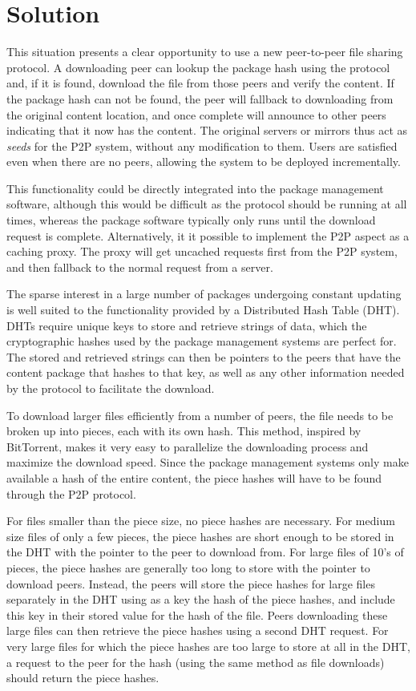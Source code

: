 \documentclass{sig-alt-release2}
\begin{document}
\section{Solution}

This situation presents a clear opportunity to use a new
peer-to-peer file sharing protocol.
A downloading peer can lookup the package hash using the protocol and, if it
is found, download the file from those peers and verify the content.
If the package hash can not be found, the peer will
fallback to downloading from the original content location, and once
complete will announce to other peers indicating that it now has
the content. The original servers or mirrors thus act as \emph{seeds} for the
P2P system, without any modification to them. Users are satisfied even when
there are no peers, allowing the system to be deployed incrementally.

This functionality could be directly integrated into the
package management software, although this would be
difficult as the protocol should be running at all times, whereas the
package software typically only runs until the download request is complete.
Alternatively, it
it possible to implement the P2P aspect as a caching
proxy. The proxy will get uncached requests first from the P2P system,
and then fallback to the normal request from a server.

The sparse interest in a large
number of packages undergoing constant updating is well suited to
the functionality provided by a Distributed Hash Table (DHT). DHTs
require unique keys to store and retrieve strings of data, which the
cryptographic hashes used by the package management systems are
perfect for. The stored and retrieved strings can then be pointers
to the peers that have the content package that hashes to that key,
as well as any other information needed by the protocol to facilitate
the download.

To download larger files efficiently from a number of peers,
the file needs to be broken up into pieces, each with its own hash.
This method, inspired by BitTorrent, makes it very easy to
parallelize the downloading process and maximize the download speed.
Since the package management systems only make
available a hash of the entire content, the piece hashes will have
to be found through the P2P protocol.

For files smaller than the piece size, no piece hashes are
necessary. For medium size files of only a few pieces, the piece
hashes are short enough to be stored in the DHT with the pointer to
the peer to download from. For large files of 10's of pieces, the
piece hashes are generally too long to store with the pointer to
download peers. Instead, the peers will store the piece hashes for
large files separately in the DHT using as a key the hash of the
piece hashes, and include this key in their stored value for the
hash of the file. Peers downloading these large files can then
retrieve the piece hashes using a second DHT request. For very large
files for which the piece hashes are too large to store at all in
the DHT, a request to the peer for the hash (using the same method
as file downloads) should return the piece hashes.
\end{document}
